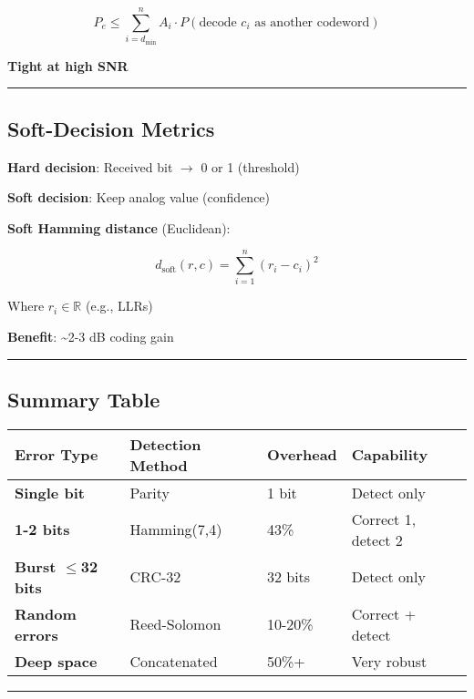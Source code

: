 \[
P_e \leq \sum_{i=d_{\min}}^{n} A_i \cdot P(\text{decode } c_i \text{ as another codeword})
\]

\textbf{Tight at high SNR}

\begin{center}\rule{0.5\linewidth}{0.5pt}\end{center}

\subsection{Soft-Decision Metrics}\label{soft-decision-metrics}

\textbf{Hard decision}: Received bit $\rightarrow$ 0 or 1 (threshold)

\textbf{Soft decision}: Keep analog value (confidence)

\textbf{Soft Hamming distance} (Euclidean):

\[
d_{\text{soft}}(r, c) = \sum_{i=1}^{n} (r_i - c_i)^2
\]

Where \(r_i \in \mathbb{R}\) (e.g., LLRs)

\textbf{Benefit}: \textasciitilde2-3 dB coding gain

\begin{center}\rule{0.5\linewidth}{0.5pt}\end{center}

\subsection{Summary Table}\label{summary-table}

{\def\LTcaptype{} %
\begin{longtable}[]{@{}llll@{}}
\toprule\noalign{}
Error Type & Detection Method & Overhead & Capability \\
\midrule\noalign{}
\endhead
\bottomrule\noalign{}
\endlastfoot
\textbf{Single bit} & Parity & 1 bit & Detect only \\
\textbf{1-2 bits} & Hamming(7,4) & 43\% & Correct 1, detect 2 \\
\textbf{Burst $\leq$32 bits} & CRC-32 & 32 bits & Detect only \\
\textbf{Random errors} & Reed-Solomon & 10-20\% & Correct + detect \\
\textbf{Deep space} & Concatenated & 50\%+ & Very robust \\
\end{longtable}
}

\begin{center}\rule{0.5\linewidth}{0.5pt}\end{center}

